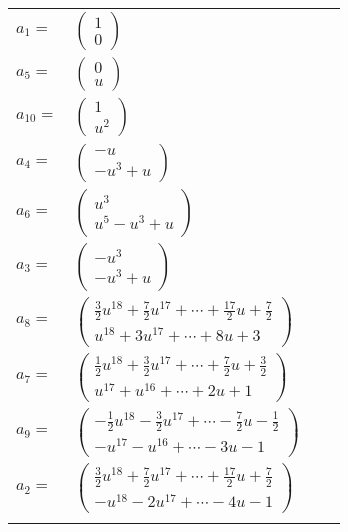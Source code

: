 \documentclass[1p]{elsarticle_modified}
\theoremstyle{definition}
\begin{document}
\begin{tabular}{m{7pt} m{180pt} m{7pt} m{180pt} }
\flushright $a_{1}=$&$\begin{pmatrix}1\\0\end{pmatrix}$ \\
\flushright $a_{5}=$&$\begin{pmatrix}0\\u\end{pmatrix}$ \\
\flushright $a_{10}=$&$\begin{pmatrix}1\\u^2\end{pmatrix}$ \\
\flushright $a_{4}=$&$\begin{pmatrix}- u\\- u^3+u\end{pmatrix}$ \\
\flushright $a_{6}=$&$\begin{pmatrix}u^3\\u^5- u^3+u\end{pmatrix}$ \\
\flushright $a_{3}=$&$\begin{pmatrix}- u^3\\- u^3+u\end{pmatrix}$ \\
\flushright $a_{8}=$&$\begin{pmatrix}\frac{3}{2} u^{18}+\frac{7}{2} u^{17}+\cdots+\frac{17}{2} u+\frac{7}{2}\\u^{18}+3 u^{17}+\cdots+8 u+3\end{pmatrix}$ \\
\flushright $a_{7}=$&$\begin{pmatrix}\frac{1}{2} u^{18}+\frac{3}{2} u^{17}+\cdots+\frac{7}{2} u+\frac{3}{2}\\u^{17}+u^{16}+\cdots+2 u+1\end{pmatrix}$ \\
\flushright $a_{9}=$&$\begin{pmatrix}-\frac{1}{2} u^{18}-\frac{3}{2} u^{17}+\cdots-\frac{7}{2} u-\frac{1}{2}\\- u^{17}- u^{16}+\cdots-3 u-1\end{pmatrix}$ \\
\flushright $a_{2}=$&$\begin{pmatrix}\frac{3}{2} u^{18}+\frac{7}{2} u^{17}+\cdots+\frac{17}{2} u+\frac{7}{2}\\- u^{18}-2 u^{17}+\cdots-4 u-1\end{pmatrix}$\\&\end{tabular}
\end{document}
